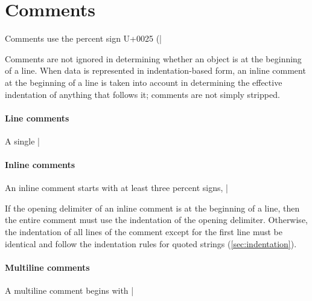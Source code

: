 \documentclass[11pt]{article}
\begin{document}
\section{Comments}

Comments use the percent sign U+0025 (|%

Comments are not ignored in determining whether an object is at the beginning of a line.  When data is represented in indentation-based form, an inline comment at the beginning of a line is taken into account in determining the effective indentation of anything that follows it; comments are not simply stripped.

\paragraph{Line comments}

A single |%


\paragraph{Inline comments}

An inline comment starts with at least three percent signs, |%

If the opening delimiter of an inline comment is at the beginning of a line, then the entire comment must use the indentation of the opening delimiter.  Otherwise, the indentation of all lines of the comment except for the first line must be identical and follow the indentation rules for quoted strings (\cref{sec:indentation}).


\paragraph{Multiline comments}

A multiline comment begins with |%
\end{document}
